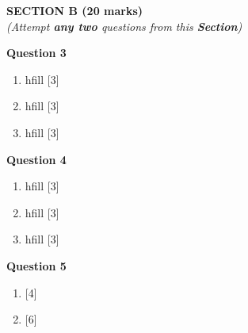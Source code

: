 \newpage
\begin{center}
   \large
   \textbf{SECTION B (20 marks)}\\
   \vspace{5mm}
   \normalsize
   \textit{(Attempt \textbf{any two} questions from this \textbf{Section})}
\end{center}
\par

\noindent
\textbf{Question 3}
\begin{enumerate}[label=(\roman*)]

    \item hfill [3]

    \item hfill [3]

    \item hfill [3]

\end{enumerate}

\noindent
\textbf{Question 4}
\begin{enumerate}[label=(\roman*)]

    \item hfill [3]

    \item hfill [3]

    \item hfill [3]

\end{enumerate}

\newpage
\noindent
\textbf{Question 5}
\begin{enumerate}[label=(\roman*)]

    \item \hfill [4]

    \item \hfill [6]

\end{enumerate}


